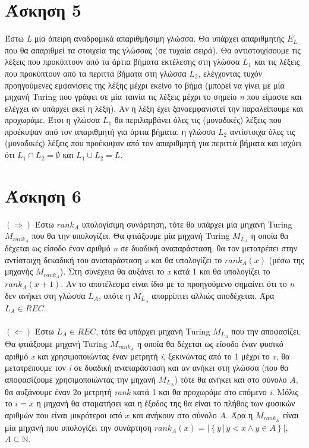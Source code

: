 \documentclass[11pt]{article}
\begin{document}
\section*{Άσκηση 5}
Έστω \textit{L} μία άπειρη αναδρομικά απαριθμήσιμη γλώσσα. Θα υπάρχει απαριθμητής $E_L$ που θα απαριθμεί τα στοιχεία της γλώσσας (σε τυχαία σειρά). Θα αντιστοιχίσουμε τις λέξεις που προκύπτουν από τα άρτια βήματα εκτέλεσης στη γλώσσα $L_1$ και τις λέξεις που προκύπτουν από τα περιττά βήματα στη γλώσσα $L_2$, ελέγχοντας τυχόν προηγούμενες εμφανίσεις της λέξης μέχρι εκείνο το βήμα (μπορεί να γίνει με μία μηχανή Turing που γράφει σε μία ταινία τις λέξεις μέχρι το σημείο \textit{n} που είμαστε και ελέγχει αν υπάρχει εκεί η λέξη). Αν η λέξη έχει ξαναεμφανιστεί την παραλείπουμε και προχωράμε. Έτσι η γλώσσα $L_1$ θα περιλαμβάνει όλες τις (μοναδικές) λέξεις που προέκυψαν από τον απαριθμητή για άρτια βήματα, η γλώσσα $L_2$ αντίστοιχα όλες τις (μοναδικές) λέξεις που προέκυψαν από τον απαριθμητή για περιττά βήματα και ισχύει ότι $L_1 \cap L_2 = \emptyset$ και $L_1 \cup L_2 = L$.



\section*{Άσκηση 6}
$(\Rightarrow)$ Έστω $rank_A$ υπολογίσιμη συνάρτηση, τότε θα υπάρχει μία μηχανή Turing $M_{rank_A}$ που θα την υπολογίζει. Θα φτιάξουμε μία μηχανή Turing $M_{L_A}$ η οποία θα δέχεται ως είσοδο έναν αριθμό \textit{n} σε δυαδική αναπαράσταση, θα τον μετατρέπει στην αντίστοιχη δεκαδική του αναπαράσταση \textit{x} και θα υπολογίζει το $rank_A(x)$ (μέσω της μηχανής $M_{rank_A}$). Στη συνέχεια θα αυξάνει το \textit{x} κατά 1 και θα υπολογίζει το $rank_A(x + 1)$. Αν το αποτέλεσμα είναι ίδιο με το προηγούμενο σημαίνει ότι το \textit{n} δεν ανήκει στη γλώσσα $L_A$, οπότε η $M_{L_A}$ απορρίπτει αλλιώς αποδέχεται. Άρα $L_A \in REC$.
\\
\\
$(\Leftarrow)$ Έστω $L_A \in REC$, τότε θα υπάρχει μηχανή Turing $M_{L_A}$ που την αποφασίζει. Θα φτιάξουμε μηχανή Turing $M_{rank_A}$ η οποία θα δέχεται ως είσοδο έναν φυσικό αριθμό \textit{x} και χρησιμοποιώντας έναν μετρητή \textit{i}, ξεκινώντας από το 1 μέχρι το \textit{x}, θα μετατρέπουμε τον \textit{i} σε δυαδική αναπαράσταση και αν ανήκει στη γλώσσα (που θα αποφασίζουμε χρησιμοποιώντας την μηχανή $M_{L_A}$) τότε θα ανήκει και στο σύνολο $A$, θα αυξάνουμε έναν 2ο μετρητή \textit{rank} κατά 1 και θα προχωράμε στο επόμενο \textit{i}. Μόλις το $i = x$ η μηχανή θα σταματήσει και η έξοδος της θα είναι το πλήθος των φυσικών αριθμών που είναι μικρότεροι από $x$ και ανήκουν στο σύνολο $A$. Άρα η $M_{rank_A}$ είναι μία μηχανή που υπολογίζει την συνάρτηση $rank_A(x) = |\left\lbrace y \, | \, y < x \land y \in A \right\rbrace |$, $A \subseteq \mathbb{N}$.
\end{document}
